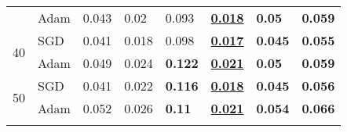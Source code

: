 \documentclass{article}
\begin{document}
\begin{table}
\begin{tabular}{cl|llllll}
                           & Adam                                    & 0.043                                     & 0.02                                      & 0.093                                              & \textbf{\uline{0.018}}                                     & \textbf{0.05}                                      & \textbf{0.059}                                      \\
\multirow{2}{*}{40}        & {\cellcolor[rgb]{0.788,0.788,0.788}}SGD & {\cellcolor[rgb]{0.788,0.788,0.788}}0.041 & {\cellcolor[rgb]{0.788,0.788,0.788}}0.018 & {\cellcolor[rgb]{0.788,0.788,0.788}}0.098          & {\cellcolor[rgb]{0.788,0.788,0.788}}\textbf{\uline{0.017}} & {\cellcolor[rgb]{0.788,0.788,0.788}}\textbf{0.045} & {\cellcolor[rgb]{0.788,0.788,0.788}}\textbf{0.055}  \\
                           & Adam                                    & 0.049                                     & 0.024                                     & \textbf{0.122}                                     & \textbf{\uline{0.021}}                                     & \textbf{0.05}                                      & \textbf{0.059}                                      \\
\multirow{2}{*}{50}        & {\cellcolor[rgb]{0.788,0.788,0.788}}SGD & {\cellcolor[rgb]{0.788,0.788,0.788}}0.041 & {\cellcolor[rgb]{0.788,0.788,0.788}}0.022 & {\cellcolor[rgb]{0.788,0.788,0.788}}\textbf{0.116} & {\cellcolor[rgb]{0.788,0.788,0.788}}\textbf{\uline{0.018}} & {\cellcolor[rgb]{0.788,0.788,0.788}}\textbf{0.045} & {\cellcolor[rgb]{0.788,0.788,0.788}}\textbf{0.056}  \\
                           & Adam                                    & 0.052                                     & 0.026                                     & \textbf{0.11}                                      & \textbf{\uline{0.021}}                                     & \textbf{0.054}                                     & \textbf{0.066}                                      \\
\bottomrule
\label{result}
\end{tabular}
\end{table}
\end{document}
